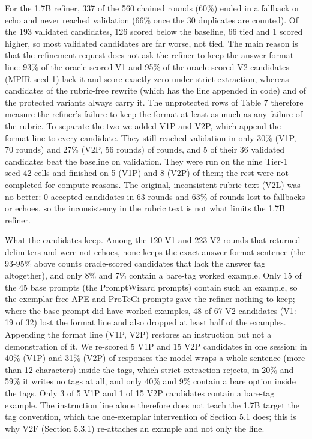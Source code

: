 \documentclass{ieeeaccess}
\begin{document}
For the 1.7B refiner, 337 of the 560 chained rounds (60\%) ended in a fallback or echo and never reached validation (66\% once the 30 duplicates are counted). Of the 193 validated candidates, 126 scored below the baseline, 66 tied and 1 scored higher, so most validated candidates are far worse, not tied. The main reason is that the refinement request does not ask the refiner to keep the answer-format line: 93\% of the oracle-scored V1 and 95\% of the oracle-scored V2 candidates (MPIR seed 1) lack it and score exactly zero under strict extraction, whereas candidates of the rubric-free rewrite (which has the line appended in code) and of the protected variants always carry it. The unprotected rows of Table 7 therefore measure the refiner's failure to keep the format at least as much as any failure of the rubric. To separate the two we added V1P and V2P, which append the format line to every candidate. They still reached validation in only 30\% (V1P, 70 rounds) and 27\% (V2P, 56 rounds) of rounds, and 5 of their 36 validated candidates beat the baseline on validation. They were run on the nine Tier-1 seed-42 cells and finished on 5 (V1P) and 8 (V2P) of them; the rest were not completed for compute reasons. The original, inconsistent rubric text (V2L) was no better: 0 accepted candidates in 63 rounds and 63\% of rounds lost to fallbacks or echoes, so the inconsistency in the rubric text is not what limits the 1.7B refiner.

What the candidates keep. Among the 120 V1 and 223 V2 rounds that returned delimiters and were not echoes, none keeps the exact answer-format sentence (the 93-95\% above counts oracle-scored candidates that lack the answer tag altogether), and only 8\% and 7\% contain a bare-tag worked example. Only 15 of the 45 base prompts (the PromptWizard prompts) contain such an example, so the exemplar-free APE and ProTeGi prompts gave the refiner nothing to keep; where the base prompt did have worked examples, 48 of 67 V2 candidates (V1: 19 of 32) lost the format line and also dropped at least half of the examples. Appending the format line (V1P, V2P) restores an instruction but not a demonstration of it. We re-scored 5 V1P and 15 V2P candidates in one session: in 40\% (V1P) and 31\% (V2P) of responses the model wraps a whole sentence (more than 12 characters) inside the tags, which strict extraction rejects, in 20\% and 59\% it writes no tags at all, and only 40\% and 9\% contain a bare option inside the tags. Only 3 of 5 V1P and 1 of 15 V2P candidates contain a bare-tag example. The instruction line alone therefore does not teach the 1.7B target the tag convention, which the one-exemplar intervention of Section 5.1 does; this is why V2F (Section 5.3.1) re-attaches an example and not only the line.
\end{document}
